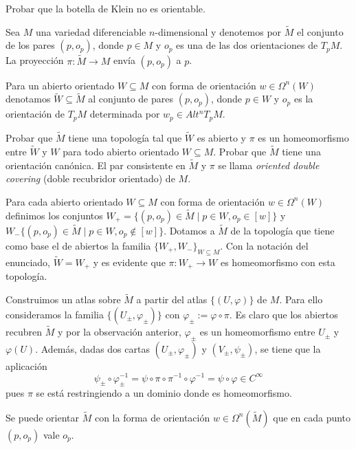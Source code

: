 \documentclass[twoside]{article}
\begin{document}
\newpage

\begin{ejercicio}{9.13}
Probar que la botella de Klein no es orientable.
\end{ejercicio}
\begin{solucion}
\end{solucion}
\newpage

\begin{ejercicio}{9.15}
Sea $M$ una variedad diferenciable $n$-dimensional y denotemos por $\widetilde{M}$ el conjunto de los pares $(p, o_p)$, donde $p\in M$ y $o_p$ es una de las dos orientaciones de $T_pM$. La proyección $\pi:\widetilde{M}\to M$ envía $(p,o_p)$ a $p$. 

Para un abierto orientado $W\subseteq M$ con forma de orientación $w\in\Omega^n(W)$ denotamos $\widetilde{W}\subseteq\widetilde{M}$ al conjunto de pares $(p,o_p)$, donde $p\in W$ y $o_p$ es la orientación de $T_pM$ determinada por $w_p\in Alt^n T_pM$.

Probar que $\widetilde{M}$ tiene una topología tal que $\widetilde{W}$ es abierto y $\pi$ es un homeomorfismo entre $\widetilde{W}$ y $W$ para todo abierto orientado $W\subseteq M$. Probar que $\widetilde{M}$ tiene una orientación canónica. El par consistente en $\widetilde{M}$ y $\pi$ se llama \emph{oriented double covering} (doble recubridor orientado) de $M$.
\end{ejercicio}
\begin{solucion}
Para cada abierto orientado $W\subseteq M$ con forma de orientación $w\in\Omega^n(W)$ definimos los conjuntos $W_+=\{(p,o_p)\in\widetilde{M}\mid p\in W, o_p\in [w]\}$ y $W_-\{(p,o_p)\in\widetilde{M}\mid p\in W, o_p\notin[w]\}$. Dotamos a $\widetilde{M}$ de la topología que tiene como base el de abiertos la familia $\{W_+,W_-\}_{W\subseteq M}$. Con la notación del enunciado, $\widetilde{W}=W_+$ y es evidente que $\pi:W_+\to W$ es homeomorfismo con esta topología.

Construimos un atlas sobre $\widetilde{M}$ a partir del atlas $\{(U,\varphi)\}$ de $M$. Para ello consideramos la familia $\{(U_\pm, \varphi_\pm)\}$ con $\varphi_\pm:=\varphi\circ\pi$. Es claro que los abiertos recubren $\widetilde{M}$ y por la observación anterior, $\varphi_\pm$ es un homeomorfismo entre $U_\pm$ y $\varphi(U)$. Además, dadas dos cartas $(U_\pm,\varphi_\pm)$ y $(V_\pm,\psi_\pm)$, se tiene que la aplicación
\[
\psi_\pm\circ \varphi_\pm^{-1}=\psi\circ\pi\circ\pi^{-1}\circ\varphi^{-1}=\psi\circ\varphi\in C^{\infty}
\]
pues $\pi$ se está restringiendo a un dominio donde es homeomorfismo.

Se puede orientar $\widetilde{M}$ con la forma de orientación $w\in\Omega^n(\widetilde{M})$ que en cada punto $(p,o_p)$ vale $o_p$. 


\end{solucion}
\newpage
\end{document}

